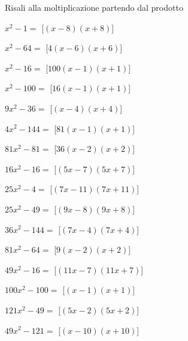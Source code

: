 \begin{esercizio}
 \label{ese:11.11}
Risali alla moltiplicazione partendo dal prodotto

\begin{multicols}{2}
\begin{enumeratea}
\spazielenx
\item \(x^{2} - 1=\) 
\hfill [\(\left(x - 8\right) \left(x + 8\right)\)]
\item \(x^{2} - 64=\) 
\hfill [\(4 \left(x - 6\right) \left(x + 6\right)\)]
\item \(x^{2} - 16=\) 
\hfill [\(100 \left(x - 1\right) \left(x + 1\right)\)]
\item \(x^{2} - 100=\) 
\hfill [\(16 \left(x - 1\right) \left(x + 1\right)\)]
\item \(9 x^{2} - 36=\) 
\hfill [\(\left(x - 4\right) \left(x + 4\right)\)]
\item \(4 x^{2} - 144=\) 
\hfill [\(81 \left(x - 1\right) \left(x + 1\right)\)]
\item \(81 x^{2} - 81=\) 
\hfill [\(36 \left(x - 2\right) \left(x + 2\right)\)]
\item \(16 x^{2} - 16=\) 
\hfill [\(\left(5 x - 7\right) \left(5 x + 7\right)\)]
\item \(25 x^{2} - 4=\) 
\hfill [\(\left(7 x - 11\right) \left(7 x + 11\right)\)]
\item \(25 x^{2} - 49=\) 
\hfill [\(\left(9 x - 8\right) \left(9 x + 8\right)\)]
\item \(36 x^{2} - 144=\) 
\hfill [\(\left(7 x - 4\right) \left(7 x + 4\right)\)]
\item \(81 x^{2} - 64=\) 
\hfill [\(9 \left(x - 2\right) \left(x + 2\right)\)]
\item \(49 x^{2} - 16=\) 
\hfill [\(\left(11 x - 7\right) \left(11 x + 7\right)\)]
\item \(100 x^{2} - 100=\) 
\hfill [\(\left(x - 1\right) \left(x + 1\right)\)]
\item \(121 x^{2} - 49=\) 
\hfill [\(\left(5 x - 2\right) \left(5 x + 2\right)\)]
\item \(49 x^{2} - 121=\) 
\hfill [\(\left(x - 10\right) \left(x + 10\right)\)]


\end{enumeratea}
\end{multicols}
\end{esercizio}
